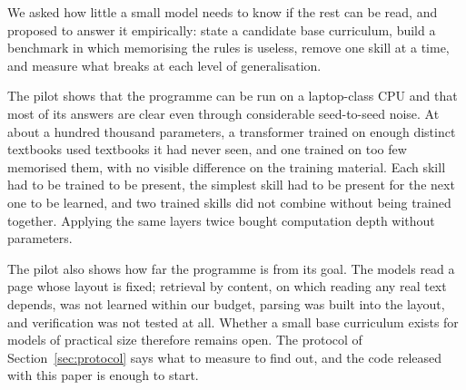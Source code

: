 We asked how little a small model needs to know if the rest can be read, and proposed to answer it empirically: state a candidate base curriculum, build a benchmark in which memorising the rules is useless, remove one skill at a time, and measure what breaks at each level of generalisation.

The pilot shows that the programme can be run on a laptop-class CPU and that most of its answers are clear even through considerable seed-to-seed noise.
At about a hundred thousand parameters, a transformer trained on enough distinct textbooks used textbooks it had never seen, and one trained on too few memorised them, with no visible difference on the training material.
Each skill had to be trained to be present, the simplest skill had to be present for the next one to be learned, and two trained skills did not combine without being trained together.
Applying the same layers twice bought computation depth without parameters.

The pilot also shows how far the programme is from its goal.
The models read a page whose layout is fixed; retrieval by content, on which reading any real text depends, was not learned within our budget, parsing was built into the layout, and verification was not tested at all.
Whether a small base curriculum exists for models of practical size therefore remains open.
The protocol of Section~\ref{sec:protocol} says what to measure to find out, and the code released with this paper is enough to start.
